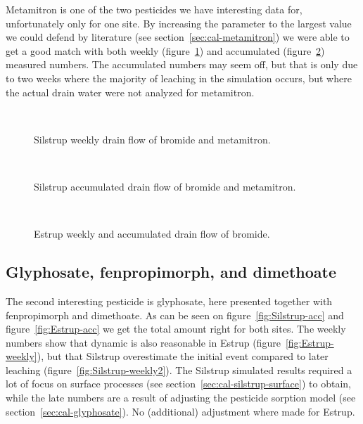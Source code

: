 Metamitron is one of the two pesticides we have interesting data for,
unfortunately only for one site.  By increasing the \kd{} parameter to
the largest value we could defend by literature (see
section~\ref{sec:cal-metamitron}) we were able to get a good match
with both weekly (figure~\ref{fig:Silstrup-weekly}) and accumulated
(figure~\ref{fig:Silstrup-bromide-acc}) measured numbers.  The
accumulated numbers may seem off, but that is only due to two weeks
where the majority of leaching in the simulation occurs, but where the
actual drain water were not analyzed for metamitron.

\begin{figure}[htbp]
  \begin{center}
    \\
  \end{center}
  \caption{Silstrup weekly drain flow of bromide and metamitron.}
  \label{fig:Silstrup-weekly}
\end{figure}

\begin{figure}[htbp]
  \begin{center}
    \\
  \end{center}
  \caption{Silstrup accumulated drain flow of bromide and metamitron.}
  \label{fig:Silstrup-bromide-acc}
\end{figure}

\begin{figure}[htbp]
  \begin{center}
    \\
  \end{center}
  \caption{Estrup weekly and accumulated drain flow of bromide.}
  \label{fig:Estrup-bromide-drain}
\end{figure}

\FloatBarrier
\subsection{Glyphosate,  fenpropimorph, and dimethoate}

The second interesting pesticide is glyphosate, here presented
together with fenpropimorph and dimethoate.  As can be seen on
figure~\ref{fig:Silstrup-acc} and figure~\ref{fig:Estrup-acc} we get
the total amount right for both sites.  The weekly numbers show that
dynamic is also reasonable in Estrup (figure~\ref{fig:Estrup-weekly}),
but that Silstrup overestimate the initial event compared to later
leaching (figure~\ref{fig:Silstrup-weekly2}).  The Silstrup simulated
results required a lot of focus on surface processes (see
section~\ref{sec:cal-silstrup-surface}) to obtain, while the late
numbers are a result of adjusting the pesticide sorption model (see
section~\ref{sec:cal-glyphosate}).  No (additional) adjustment where
made for Estrup.

